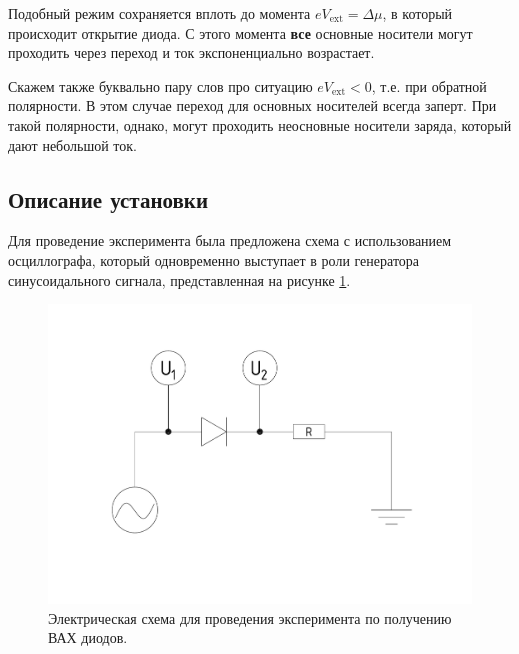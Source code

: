 \documentclass[a4paper, 12pt]{article}
\begin{document}
Подобный режим сохраняется вплоть до момента $e V_{\text{ext}} = \Delta \mu$, в который происходит открытие диода. С этого момента \textbf{все} основные носители могут проходить через переход и ток экспоненциально возрастает.

Скажем также буквально пару слов про ситуацию $e V_{\text{ext}} < 0$, т.е. при обратной полярности. В этом случае переход для основных носителей всегда заперт. При такой полярности, однако, могут проходить неосновные носители заряда, который дают небольшой ток.


\subsection{Описание установки}

Для проведение эксперимента была предложена схема с использованием осциллографа, который одновременно выступает в роли генератора синусоидального сигнала, представленная на рисунке \ref{fig:2_Experiment_Scheme}.

\begin{figure}[H]
	\centering
	\includegraphics[width=\linewidth]{2_Experiment_Scheme}
	\caption{Электрическая схема для проведения эксперимента по получению ВАХ диодов.}
	\label{fig:2_Experiment_Scheme}
\end{figure}
\end{document}
